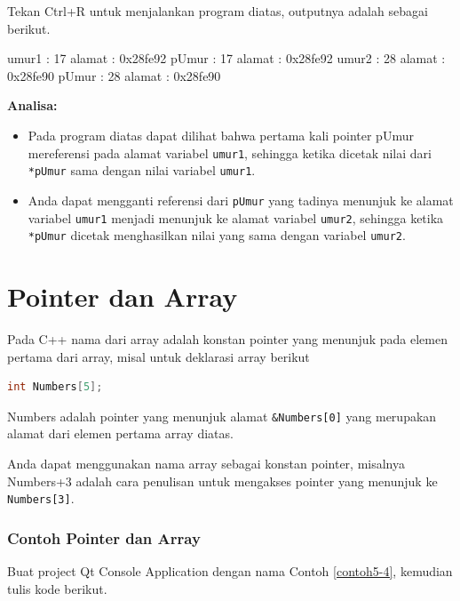 Tekan Ctrl+R untuk menjalankan program diatas, outputnya adalah sebagai
berikut.

\begin{lcverbatim}
umur1 : 17 alamat : 0x28fe92
pUmur : 17 alamat : 0x28fe92
umur2 : 28 alamat : 0x28fe90
pUmur : 28 alamat : 0x28fe90
\end{lcverbatim}

\textbf{Analisa:}

\begin{itemize}

\item
  Pada program diatas dapat dilihat bahwa pertama kali pointer pUmur
  mereferensi pada alamat variabel \texttt{umur1}, sehingga ketika
  dicetak nilai dari \texttt{*pUmur} sama dengan nilai variabel
  \texttt{umur1}.
\item
  Anda dapat mengganti referensi dari \texttt{pUmur} yang tadinya
  menunjuk ke alamat variabel \texttt{umur1} menjadi menunjuk ke alamat
  variabel \texttt{umur2}, sehingga ketika \texttt{*pUmur} dicetak
  menghasilkan nilai yang sama dengan variabel \texttt{umur2}.
\end{itemize}

\section{Pointer dan Array}\label{pointer-dan-array}

Pada C++ nama dari array adalah konstan pointer yang menunjuk pada
elemen pertama dari array, misal untuk deklarasi array berikut

\begin{lstlisting}[language=c++, numbers=none]
int Numbers[5];
\end{lstlisting}

Numbers adalah pointer yang menunjuk alamat \texttt{\&Numbers{[}0{]}}
yang merupakan alamat dari elemen pertama array diatas.

Anda dapat menggunakan nama array sebagai konstan pointer, misalnya
Numbers+3 adalah cara penulisan untuk mengakses pointer yang menunjuk ke
\texttt{Numbers{[}3{]}}.

\subsubsection*{Contoh  Pointer dan Array}

Buat project Qt Console Application dengan nama Contoh \ref{contoh5-4}, kemudian tulis
kode berikut.

